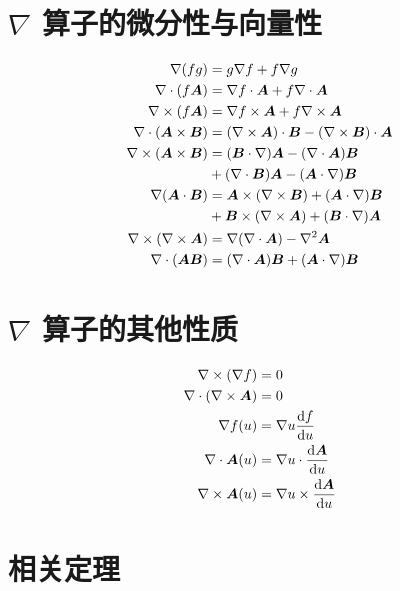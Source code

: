 \section{\texorpdfstring{$\nabla$}{nabla} 算子的微分性与向量性}

\begin{align}
\nabla {(f g)} &= g \nabla {f} + f \nabla {g} \\
\nabla \cdot {(f \bm{A})} &= \nabla {f} \cdot \bm{A} + f \nabla \cdot {\bm{A}} \\
\nabla \times {(f \bm{A})} &= \nabla {f} \times \bm{A} + f \nabla \times {\bm{A}} \\
\nabla \cdot {(\bm{A} \times \bm{B})} &= (\nabla \times {\bm{A}}) \cdot \bm{B} - (\nabla \times {\bm{B}}) \cdot \bm{A} \\
\nabla \times {(\bm{A} \times \bm{B})} &= (\bm{B} \cdot \nabla {)} \bm{A} - (\nabla \cdot {\bm{A}}) \bm{B} \\
& + (\nabla \cdot {\bm{B}}) \bm{A} - (\bm{A} \cdot \nabla {)} \bm{B} \\
\nabla {(\bm{A} \cdot \bm{B})} &= \bm{A} \times (\nabla \times {\bm{B}}) + (\bm{A} \cdot \nabla {)} \bm{B} \\
& + \bm{B} \times (\nabla \times {\bm{A}}) + (\bm{B} \cdot \nabla {)} \bm{A} \\
\nabla \times {(\nabla \times {\bm{A}})} &= \nabla {(\nabla \cdot {\bm{A}})} - \nabla^2 \bm{A} \\
\nabla \cdot {(\bm{A} \bm{B})} &= (\nabla \cdot {\bm{A}}) \bm{B} + (\bm{A} \cdot \nabla {)} \bm{B}
\end{align}

\section{\texorpdfstring{$\nabla$}{nabla} 算子的其他性质}

\begin{align}
    \nabla \times {(\nabla {f})} &= 0 \\
    \nabla \cdot {(\nabla \times {\bm{A}})} &= 0 \\
    \nabla {f(u)} &= \nabla {u} \frac{\mathop{}\!\mathrm{d} {f}}{\mathop{}\!\mathrm{d} {u}} \\
    \nabla \cdot {\bm{A}(u)} &= \nabla {u} \cdot \frac{\mathop{}\!\mathrm{d} {\bm{A}}}{\mathop{}\!\mathrm{d} {u}} \\
    \nabla \times {\bm{A}(u)} &= \nabla {u} \times \frac{\mathop{}\!\mathrm{d} {\bm{A}}}{\mathop{}\!\mathrm{d} {u}}
\end{align}

\section{相关定理}

